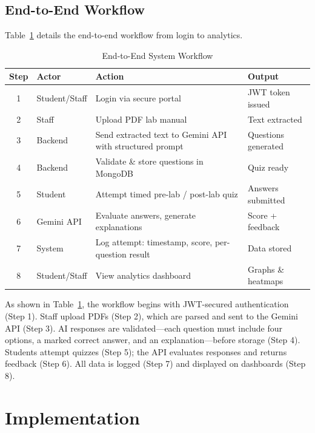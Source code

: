 \documentclass[conference]{IEEEtran}
\begin{document}
\subsection{End-to-End Workflow}

Table~\ref{tab:workflow} details the end-to-end workflow from login to analytics.

\begin{table}[h]
\caption{End-to-End System Workflow}
\label{tab:workflow}
\centering
\renewcommand{\arraystretch}{1.25}
\begin{tabular}{|c|p{1.1cm}|p{2.2cm}|p{1.7cm}|}
\hline
\textbf{Step} & \textbf{Actor} & \textbf{Action} & \textbf{Output} \\
\hline
1 & Student/Staff & Login via secure portal & JWT token issued \\
\hline
2 & Staff & Upload PDF lab manual & Text extracted \\
\hline
3 & Backend & Send extracted text to Gemini API with structured prompt & Questions generated \\
\hline
4 & Backend & Validate \& store questions in MongoDB & Quiz ready \\
\hline
5 & Student & Attempt timed pre-lab / post-lab quiz & Answers submitted \\
\hline
6 & Gemini API & Evaluate answers, generate explanations & Score + feedback \\
\hline
7 & System & Log attempt: timestamp, score, per-question result & Data stored \\
\hline
8 & Student/Staff & View analytics dashboard & Graphs \& heatmaps \\
\hline
\end{tabular}
\end{table}

As shown in Table~\ref{tab:workflow}, the workflow begins with JWT-secured authentication (Step 1). Staff upload PDFs (Step 2), which are parsed and sent to the Gemini API (Step 3). AI responses are validated—each question must include four options, a marked correct answer, and an explanation—before storage (Step 4). Students attempt quizzes (Step 5); the API evaluates responses and returns feedback (Step 6). All data is logged (Step 7) and displayed on dashboards (Step 8).

\section{Implementation}
\label{sec:impl}
\end{document}
